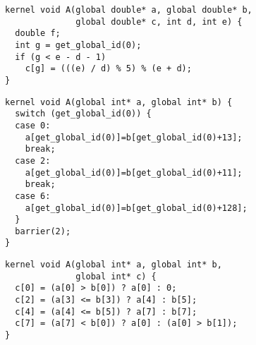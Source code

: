 \newsavebox{\IntelSizetIntUnreduced}
\begin{lrbox}{\IntelSizetIntUnreduced}
  \begin{minipage}{\textwidth}
    \begin{verbatim}
kernel void A(global double* a, global double* b,
              global double* c, int d, int e) {
  double f;
  int g = get_global_id(0);
  if (g < e - d - 1)
    c[g] = (((e) / d) % 5) % (e + d);
}
    \end{verbatim}
  \end{minipage}
\end{lrbox}

\newsavebox{\OclgrindRaceSwitch}
\begin{lrbox}{\OclgrindRaceSwitch}
  \begin{minipage}{\textwidth}
    \begin{verbatim}
kernel void A(global int* a, global int* b) {
  switch (get_global_id(0)) {
  case 0:
    a[get_global_id(0)]=b[get_global_id(0)+13];
    break;
  case 2:
    a[get_global_id(0)]=b[get_global_id(0)+11];
    break;
  case 6:
    a[get_global_id(0)]=b[get_global_id(0)+128];
  }
  barrier(2);
}
    \end{verbatim}
  \end{minipage}
\end{lrbox}

\newsavebox{\BeignetTernary}
\begin{lrbox}{\BeignetTernary}
  \begin{minipage}{\textwidth}
    \begin{verbatim}
kernel void A(global int* a, global int* b,
              global int* c) {
  c[0] = (a[0] > b[0]) ? a[0] : 0;
  c[2] = (a[3] <= b[3]) ? a[4] : b[5];
  c[4] = (a[4] <= b[5]) ? a[7] : b[7];
  c[7] = (a[7] < b[0]) ? a[0] : (a[0] > b[1]);
}
    \end{verbatim}
  \end{minipage}
\end{lrbox}
